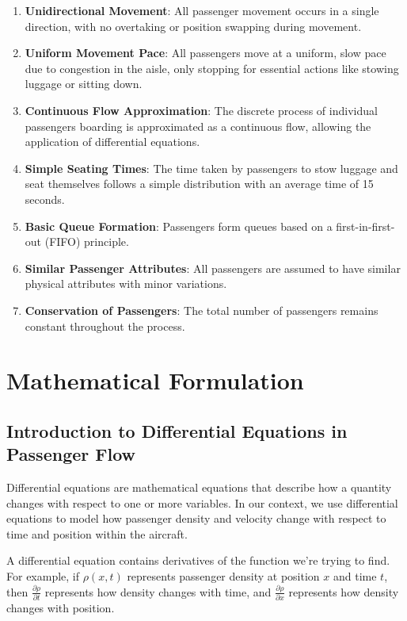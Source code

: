 \documentclass[a4paper,12pt]{article}
\begin{document}
\begin{enumerate}
    \item \textbf{Unidirectional Movement}: All passenger movement occurs in a single direction, with no overtaking or position swapping during movement.

    \item \textbf{Uniform Movement Pace}: All passengers move at a uniform, slow pace due to congestion in the aisle, only stopping for essential actions like stowing luggage or sitting down.

    \item \textbf{Continuous Flow Approximation}: The discrete process of individual passengers boarding is approximated as a continuous flow, allowing the application of differential equations.

    \item \textbf{Simple Seating Times}: The time taken by passengers to stow luggage and seat themselves follows a simple distribution with an average time of 15 seconds.

    \item \textbf{Basic Queue Formation}: Passengers form queues based on a first-in-first-out (FIFO) principle.

    \item \textbf{Similar Passenger Attributes}: All passengers are assumed to have similar physical attributes with minor variations.

    \item \textbf{Conservation of Passengers}: The total number of passengers remains constant throughout the process.
\end{enumerate}

\section{Mathematical Formulation}

\subsection{Introduction to Differential Equations in Passenger Flow}

Differential equations are mathematical equations that describe how a quantity changes with respect to one or more variables. In our context, we use differential equations to model how passenger density and velocity change with respect to time and position within the aircraft.

A differential equation contains derivatives of the function we're trying to find. For example, if $\rho(x,t)$ represents passenger density at position $x$ and time $t$, then $\frac{\partial \rho}{\partial t}$ represents how density changes with time, and $\frac{\partial \rho}{\partial x}$ represents how density changes with position.
\end{document}
